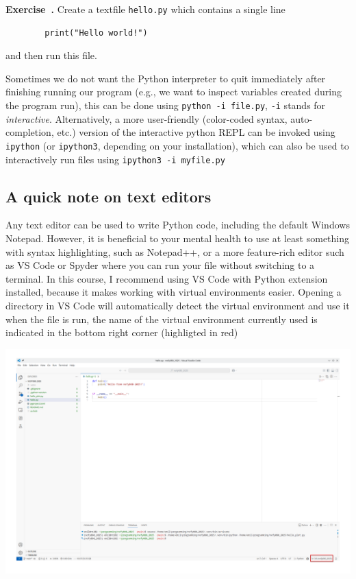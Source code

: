 \documentclass{article}
\newcounter{exercise}
\newenvironment{exercise}[1][]%
    {\refstepcounter{exercise}%
    \begin{mdframed}[backgroundcolor=exercise,linecolor=white]%
    \textbf{Exercise~\theexercise.} #1 \rmfamily}%
    {\medskip\end{mdframed}}
\newcounter{syntax}
\begin{document}
\begin{exercise}
    Create a textfile \verb|hello.py| which contains a single line
    \begin{lstlisting}
        print("Hello world!")
    \end{lstlisting}
    and then run this file.
\end{exercise}

Sometimes we do not want the Python interpreter to quit immediately after finishing running our program (e.g., we want to inspect variables created during the program run), this can be done using \verb|python -i file.py|, \verb|-i| stands for \emph{interactive}. Alternatively, a more user-friendly (color-coded syntax, auto-completion, etc.) version of the interactive python REPL can be invoked using \verb|ipython| (or \verb|ipython3|, depending on your installation), which can also be used to interactively run files using \verb|ipython3 -i myfile.py|

\subsection{A quick note on text editors}
Any text editor can be used to write Python code, including the default Windows Notepad. However, it is beneficial to your mental health to use at least something with syntax highlighting, such as Notepad++, or a more feature-rich editor such as VS Code or Spyder where you can run your file without switching to a terminal. In this course, I recommend using VS Code with Python extension installed, because it makes working with virtual environments easier. Opening a directory in VS Code will automatically detect the virtual environment and use it when the file is run, the name of the virtual environment currently used is indicated in the bottom right corner (highligted in red)
\begin{center}
    \includegraphics[width=0.9\linewidth]{vscode.png}
\end{center}
\end{document}
